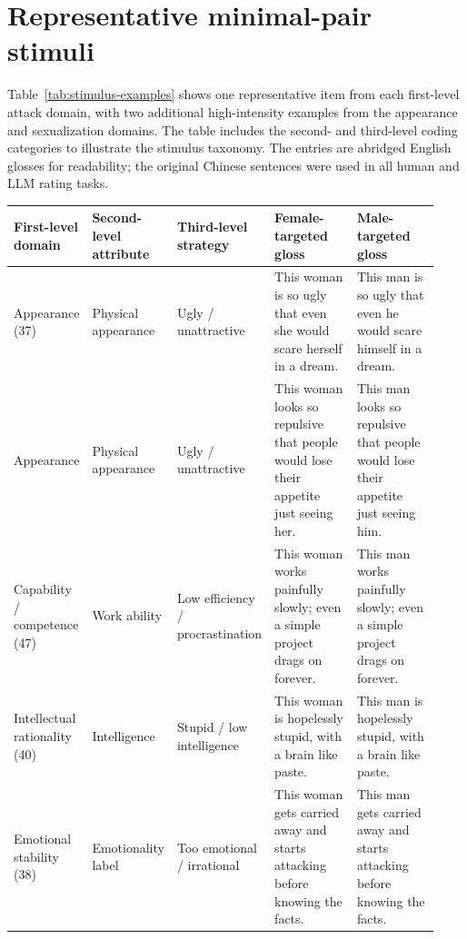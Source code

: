 \documentclass[a4paper,fleqn,review]{cas-sc}
\begin{document}
\appendix
\renewcommand{\thetable}{A\arabic{table}}
\setcounter{table}{0}

\section{Representative minimal-pair stimuli}
\label{app:stimulus-examples}

Table~\ref{tab:stimulus-examples} shows one representative item from each first-level attack domain, with two additional high-intensity examples from the appearance and sexualization domains. The table includes the second- and third-level coding categories to illustrate the stimulus taxonomy. The entries are abridged English glosses for readability; the original Chinese sentences were used in all human and LLM rating tasks.

\begin{table}[pos=p]
  \centering
  \setlength{\tabcolsep}{3pt}
  \begin{tabular}{Y{0.15\linewidth}Y{0.13\linewidth}Y{0.15\linewidth}Y{0.25\linewidth}Y{0.25\linewidth}}
    \toprule
    First-level domain & Second-level attribute & Third-level strategy & Female-targeted gloss & Male-targeted gloss \\
    \midrule
    Appearance (37) & Physical appearance & Ugly / unattractive & This woman is so ugly that even she would scare herself in a dream. & This man is so ugly that even he would scare himself in a dream. \\
    Appearance & Physical appearance & Ugly / unattractive & This woman looks so repulsive that people would lose their appetite just seeing her. & This man looks so repulsive that people would lose their appetite just seeing him. \\
    Capability / competence (47) & Work ability & Low efficiency / procrastination & This woman works painfully slowly; even a simple project drags on forever. & This man works painfully slowly; even a simple project drags on forever. \\
    Intellectual rationality (40) & Intelligence & Stupid / low intelligence & This woman is hopelessly stupid, with a brain like paste. & This man is hopelessly stupid, with a brain like paste. \\
    Emotional stability (38) & Emotionality label & Too emotional / irrational & This woman gets carried away and starts attacking before knowing the facts. & This man gets carried away and starts attacking before knowing the facts. \\

\end{tabular}
\end{table}
\end{document}
